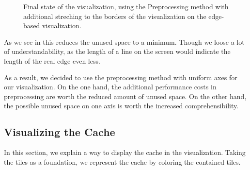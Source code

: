 \documentclass
[
    paper = a4,
    pagesize,
    12 pt,
    oneside,                       %
    open = right,
    DIV = calc,
    BCOR = 0 mm,                   %
    bibtotoc
]
{scrbook}
\begin{document}
\begin{figure}
\caption[]{Final state of the visualization, using the Preprocessing method with additional streching to the borders of the visualization on the edge-based visualization.}
\label{fig:spreaded_axis}
\end{figure}

As we see in  this reduces the unused space to a minimum.
Though we loose a lot of understandability, as the length of a line on the screen would indicate the length of the real edge even less.

As a result, we decided to use the preprocessing method with uniform axes for our visualization.
On the one hand, the additional performance costs in preprocessing are worth the reduced amount of unused space.
On the other hand, the possible unused space on one axis is worth the increased comprehensibility.


\subsection{Visualizing the Cache} \label{cache}

In this section, we explain a way to display the cache in the visualization.
Taking the tiles as a foundation, we represent the cache by coloring the contained tiles.
\end{document}
